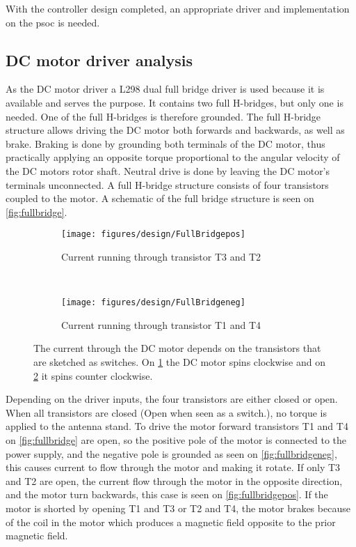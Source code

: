 With the controller design completed, an appropriate driver and implementation on the \gls{psoc} is needed.

\subsection{DC motor driver analysis}
As the DC motor driver a L298 dual full bridge driver \cite{datasheet:L298} is used because it is available and serves the purpose. It contains two full H-bridges, but only one is needed. One of the full H-bridges is therefore grounded. The full H-bridge structure allows driving the DC motor both forwards and backwards, as well as brake. Braking is done by grounding both terminals of the DC motor, thus practically applying an opposite torque proportional to the angular velocity of the DC motors rotor shaft. Neutral drive is done by leaving the DC motor's terminals unconnected. A full H-bridge structure consists of four transistors coupled to the motor. A schematic of the full bridge structure is seen on \autoref{fig:fullbridge}.
\begin{figure}[h!]
	\centering
	\begin{subfigure}[b]{0.45\textwidth}
		\texttt{[image: figures/design/FullBridgepos]}
		\caption{Current running through transistor T3 and T2}
		\label{fig:fullbridgepos}
	\end{subfigure}
	~ 
	\begin{subfigure}[b]{0.45\textwidth}
		\texttt{[image: figures/design/FullBridgeneg]}
		\caption{Current running through transistor T1 and T4}
		\label{fig:fullbridgeneg}
	\end{subfigure}
	\caption{The current through the DC motor depends on the transistors that are sketched as switches. On \ref{fig:fullbridgepos} the DC motor spins clockwise and on \ref{fig:fullbridgeneg} it spins counter clockwise.}
	\label{fig:fullbridge}
\end{figure}

Depending on the driver inputs, the four transistors are either closed or open. When all transistors are closed (Open when seen as a switch.), no torque is applied to the antenna stand.
To drive the motor forward transistors T1 and T4 on \autoref{fig:fullbridge} are open, so the positive pole of the motor is connected to the power supply, and the negative pole is grounded as seen on \autoref{fig:fullbridgeneg}, this causes current to flow through the motor and making it rotate.
If only T3 and T2 are open, the current flow through the motor in the opposite direction, and the motor turn backwards, this case is seen on \autoref{fig:fullbridgepos}.
If the motor is shorted by opening T1 and T3 or T2 and T4, the motor brakes because of the coil in the motor which produces a magnetic field opposite to the prior magnetic field. 

